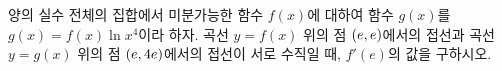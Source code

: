 양의 실수 전체의 집합에서 미분가능한 함수 $f(x)$에 대하여 함수 $g(x)$를 $g(x)=f(x)\ln x^4$이라 하자. 곡선 $y=f(x)$ 위의 점 $(e{,}\mkern3mu\mathopen{}e)$에서의 접선과 곡선 $y=g(x)$ 위의 점 $(e{,}\mkern3mu\mathopen{}4e)$에서의 접선이 서로 수직일 때, $f'(e)$의 값을 구하시오.

